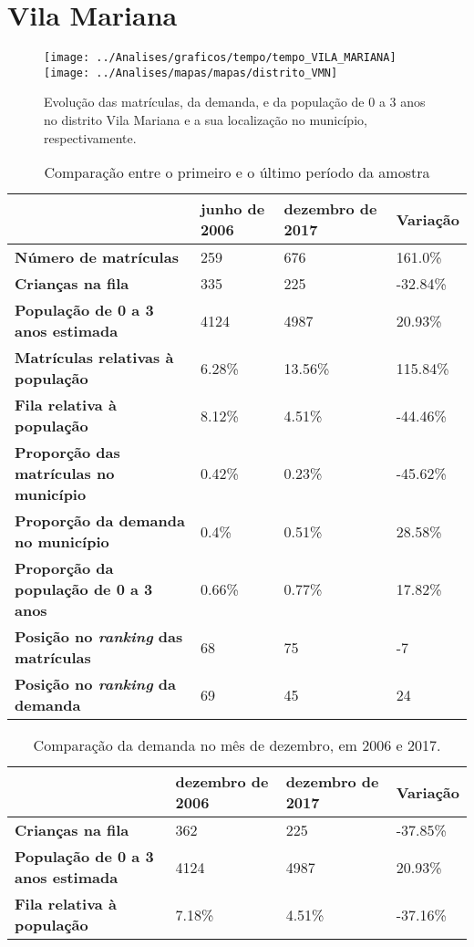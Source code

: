 \section{Vila Mariana}
\begin{figure}[H]
\centering
\texttt{[image: ../Analises/graficos/tempo/tempo\_VILA\_MARIANA]}
\texttt{[image: ../Analises/mapas/mapas/distrito\_VMN]}
\caption{Evolução das matrículas, da demanda, e da população de 0 a 3 anos no distrito Vila Mariana e a sua localização no município, respectivamente.}
\end{figure}
\begin{table}[H]
\begin{tabular}{l|l|l|l}
\textbf{}                                      & \textbf{junho de 2006}       & \textbf{dezembro de 2017}    & \textbf{Variação} \\ \hline
\textbf{Número de matrículas}                  & 259 & 676 & 161.0\% \\ \hline
\textbf{Crianças na fila}                      & 335 & 225 & -32.84\% \\ \hline
\textbf{População de 0 a 3 anos estimada}      & 4124 & 4987 & 20.93\% \\ \hline
\textbf{Matrículas relativas à população}      & 6.28\% & 13.56\% & 115.84\% \\ \hline
\textbf{Fila relativa à população}             & 8.12\% & 4.51\% & -44.46\% \\ \hline
\textbf{Proporção das matrículas no município} & 0.42\% & 0.23\% & -45.62\% \\ \hline
\textbf{Proporção da demanda no município}     & 0.4\% & 0.51\% & 28.58\% \\ \hline
\textbf{Proporção da população de 0 a 3 anos}  & 0.66\% & 0.77\% & 17.82\% \\ \hline
\textbf{Posição no \textit{ranking} das matrículas}     & 68 & 75 & -7 \\ \hline
\textbf{Posição no \textit{ranking} da demanda}         & 69 & 45 & 24 \\ 
\end{tabular}
\caption{Comparação entre o primeiro e o último período da amostra}
\end{table}
\begin{table}[H]
\begin{tabular}{l|l|l|l}
\textbf{}                                 & \textbf{dezembro de 2006} & \textbf{dezembro de 2017} & \textbf{Variação} \\ \hline
\textbf{Crianças na fila}                      & 362 & 225 & -37.85\% \\ \hline
\textbf{População de 0 a 3 anos estimada}      & 4124 & 4987 & 20.93\% \\ \hline
\textbf{Fila relativa à população}             & 7.18\% & 4.51\% & -37.16\% \\
\end{tabular}
\caption{Comparação da demanda no mês de dezembro, em 2006 e 2017.}
\end{table}

